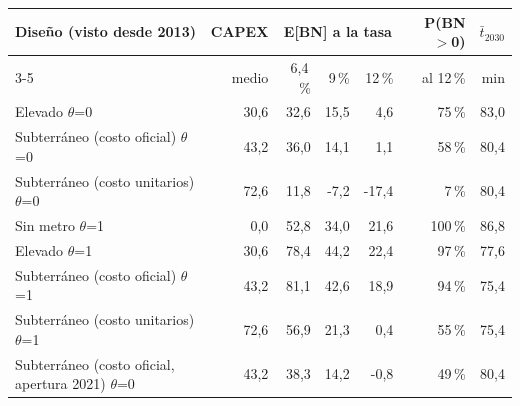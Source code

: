 \begin{tabular}{p{5.2cm}rrrrrr}
\toprule
Diseño (visto desde 2013) & CAPEX & \multicolumn{3}{c}{E[BN] a la tasa} & P(BN$>$0) & $\bar t_{2030}$ \\
\cmidrule(lr){3-5}
 & medio & 6,4\,\% & 9\,\% & 12\,\% & al 12\,\% & min \\
\midrule
Elevado \textbar{} $\theta$=0 & 30,6 & 32,6 & 15,5 & 4,6 & 75\,\% & 83,0 \\
Subterráneo (costo oficial) \textbar{} $\theta$=0 & 43,2 & 36,0 & 14,1 & 1,1 & 58\,\% & 80,4 \\
Subterráneo (costo unitarios) \textbar{} $\theta$=0 & 72,6 & 11,8 & -7,2 & -17,4 & 7\,\% & 80,4 \\
Sin metro \textbar{} $\theta$=1 & 0,0 & 52,8 & 34,0 & 21,6 & 100\,\% & 86,8 \\
Elevado \textbar{} $\theta$=1 & 30,6 & 78,4 & 44,2 & 22,4 & 97\,\% & 77,6 \\
Subterráneo (costo oficial) \textbar{} $\theta$=1 & 43,2 & 81,1 & 42,6 & 18,9 & 94\,\% & 75,4 \\
Subterráneo (costo unitarios) \textbar{} $\theta$=1 & 72,6 & 56,9 & 21,3 & 0,4 & 55\,\% & 75,4 \\
Subterráneo (costo oficial, apertura 2021) \textbar{} $\theta$=0 & 43,2 & 38,3 & 14,2 & -0,8 & 49\,\% & 80,4 \\
\bottomrule
\end{tabular}

